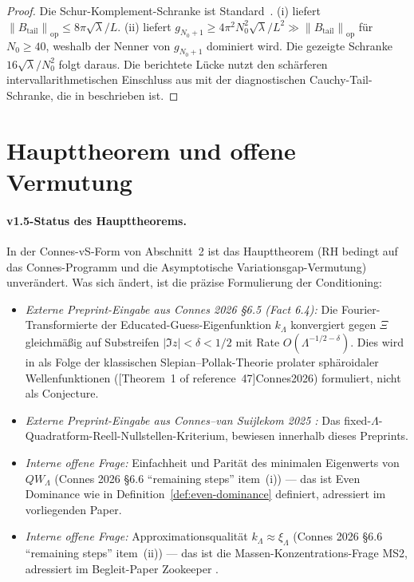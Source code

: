 \documentclass[11pt,a4paper]{article}
\theoremstyle{remark}
\theoremstyle{plain}
\newcommand{\norm}[1]{\left\lVert #1 \right\rVert}
\begin{document}
\begin{proof}
Die Schur-Komplement-Schranke ist Standard~\cite{Kato1966}. (i) liefert $\norm{B_{\mathrm{tail}}}_{\mathrm{op}}\leq 8\pi\sqrt\lambda/L$. (ii) liefert $g_{N_0+1}\geq 4\pi^2 N_0^2\sqrt\lambda/L^2 \gg \norm{B_{\mathrm{tail}}}_{\mathrm{op}}$ für $N_0\geq 40$, weshalb der Nenner von $g_{N_0+1}$ dominiert wird. Die gezeigte Schranke $16\sqrt\lambda/N_0^2$ folgt daraus. Die berichtete Lücke nutzt den schärferen intervallarithmetischen Einschluss aus \cite[Abschnitt~2.9]{GeigerLandscapeII} mit der diagnostischen Cauchy-Tail-Schranke, die in  beschrieben ist.
\end{proof}

\section{Haupttheorem und offene Vermutung}

\paragraph{v1.5-Status des Haupttheorems.}  In der Connes-vS-Form von Abschnitt~2 ist das Haupttheorem (RH bedingt auf das Connes-Programm und die Asymptotische Variationsgap-Vermutung) unverändert. Was sich ändert, ist die präzise Formulierung der Conditioning:
\begin{itemize}[leftmargin=*]
  \item \emph{Externe Preprint-Eingabe aus Connes 2026 §6.5 (Fact 6.4):} Die Fourier-Transformierte der Educated-Guess-Eigenfunktion $k_\Lambda$ konvergiert gegen $\Xi$ gleichmäßig auf Substreifen $|\Im z|<\delta<1/2$ mit Rate $O(\Lambda^{-1/2-\delta})$. Dies wird in \cite{Connes2026} als Folge der klassischen Slepian--Pollak-Theorie prolater sphäroidaler Wellenfunktionen ([Theorem~1 of reference~47]{Connes2026}) formuliert, nicht als Conjecture.
  \item \emph{Externe Preprint-Eingabe aus Connes--van Suijlekom 2025 \cite{ConnesvS2025}:} Das fixed-$\Lambda$-Quadratform-Reell-Nullstellen-Kriterium, bewiesen innerhalb dieses Preprints.
  \item \emph{Interne offene Frage:} Einfachheit und Parität des minimalen Eigenwerts von $QW_\Lambda$ (Connes 2026 §6.6 ``remaining steps'' item~(i)) --- das ist Even Dominance wie in Definition~\ref{def:even-dominance} definiert, adressiert im vorliegenden Paper.
  \item \emph{Interne offene Frage:} Approximationsqualität $k_\Lambda\approx\xi_\Lambda$ (Connes 2026 §6.6 ``remaining steps'' item~(ii)) --- das ist die Massen-Konzentrations-Frage MS2, adressiert im Begleit-Paper Zookeeper \cite{GeigerZookeeper2026}.
\end{itemize}
\end{document}
